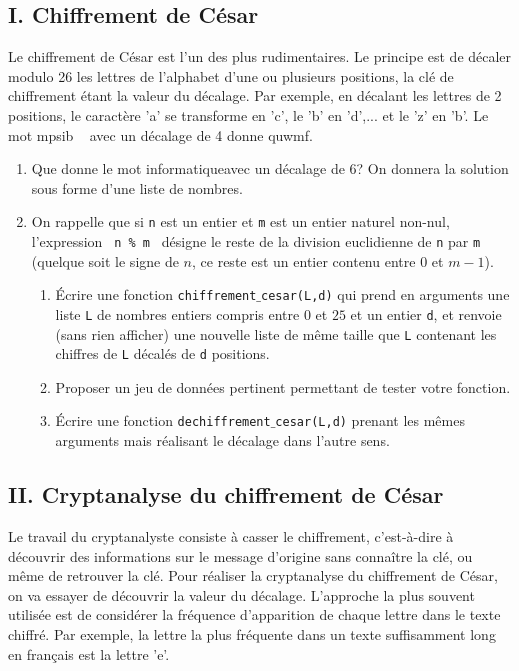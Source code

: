 \subsection*{I. Chiffrement de César}
Le chiffrement de César est l'un des plus rudimentaires. Le principe est de décaler modulo 26 les lettres de l'alphabet d'une ou plusieurs positions, la clé de chiffrement étant la valeur du décalage.\newline
Par exemple, en décalant les lettres de 2 positions, le caractère 'a' se transforme en 'c', le 'b' en 'd',... et le 'z' en 'b'. Le mot \og mpsib \fg~ avec un décalage de 4 donne \og quwmf\fg.
\begin{enumerate}
\item Que donne le mot \og informatique\fg avec un décalage de 6? On donnera la solution sous forme d'une liste de nombres.

\item On rappelle que si \texttt{n} est un entier et \texttt{m} est un entier naturel non-nul, l'expression \texttt{ n \% m } désigne le reste de la division euclidienne de \texttt{n} par \texttt{m} (quelque soit le signe de $n$, ce reste est un entier contenu entre $0$ et $m-1$).
\begin{enumerate}
\item \'Ecrire une fonction \texttt{chiffrement$\_$cesar(L,d)} qui prend en arguments une liste \texttt{L} de nombres entiers compris entre $0$ et $25$ et un entier \texttt{d}, et renvoie (sans rien afficher) une nouvelle liste de même taille que \texttt{L} contenant les chiffres de \texttt{L} décalés de \texttt{d} positions. 

\item Proposer un jeu de données pertinent permettant de tester votre fonction.

\item \'Ecrire une fonction \texttt{dechiffrement$\_$cesar(L,d)} prenant les mêmes arguments mais réalisant le décalage dans l'autre sens.
\end{enumerate}
\end{enumerate}

\subsection*{II. Cryptanalyse du chiffrement de César}

Le travail du cryptanalyste consiste à casser le chiffrement, c'est-à-dire à découvrir des informations sur le message d'origine sans connaître la clé, ou même de retrouver la clé.
Pour réaliser la cryptanalyse du chiffrement de César, on va essayer de découvrir la valeur du décalage.\newline 
L'approche la plus souvent utilisée est de considérer la fréquence d'apparition de chaque lettre dans le texte chiffré. Par exemple, la lettre la plus fréquente dans un texte suffisamment long en fran\c cais est la lettre 'e'.

